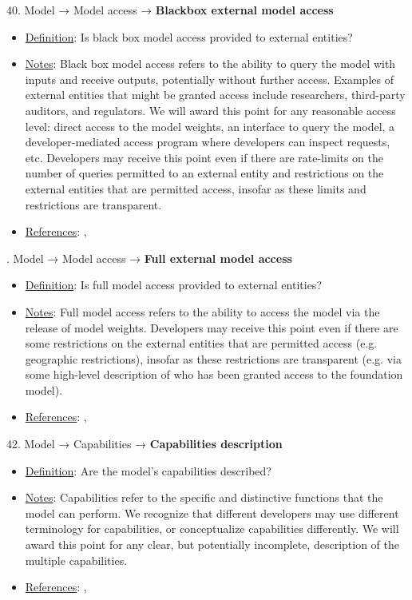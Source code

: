 40. Model → Model access → \textbf{Blackbox external model access}
\vspace{-\parskip}
\begin{itemize}
\item
\underline{Definition}: Is black box model access provided to external entities?
\item
\underline{Notes}: Black box model access refers to the ability to query the model with inputs and receive outputs, potentially without further access. Examples of external entities that might be granted access include researchers, third-party auditors, and regulators. We will award this point for any reasonable access level: direct access to the model weights, an interface to query the model, a developer-mediated access program where developers can inspect requests, etc. Developers may receive this point even if there are rate-limits on the number of queries permitted to an external entity and restrictions on the external entities that are permitted access, insofar as these limits and restrictions are transparent.
\item
\underline{References}: \citet{solaiman2023gradient}, \citet{shevlane2022structured}
\end{itemize}


. Model → Model access → \textbf{Full external model access}
\vspace{-\parskip}
\begin{itemize}
\item
\underline{Definition}: Is full model access provided to external entities?
\item
\underline{Notes}: Full model access refers to the ability to access the model via the release of model weights. Developers may receive this point even if there are some restrictions on the external entities that are permitted access (e.g. geographic restrictions), insofar as these restrictions are transparent (e.g. via some high-level description of who has been granted access to the foundation model).
\item
\underline{References}: \citet{solaiman2023gradient}, \citet{shevlane2022structured}
\end{itemize}


42. Model → Capabilities → \textbf{Capabilities description}
\vspace{-\parskip}
\begin{itemize}
\item
\underline{Definition}: Are the model's capabilities described?
\item
\underline{Notes}: Capabilities refer to the specific and distinctive functions that the model can perform. We recognize that different developers may use different terminology for capabilities, or conceptualize capabilities differently. We will award this point for any clear, but potentially incomplete, description of the multiple capabilities.
\item
\underline{References}: \citet{srivastava2022bigbench}, \citet{liang2022helm}
\end{itemize}


